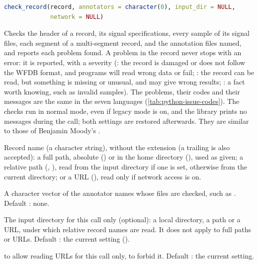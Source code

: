 \begin{lstlisting}[language=R,style=signature]
check_record(record, annotators = character(0), input_dir = NULL,
             network = NULL)
\end{lstlisting}
Checks the header of a record, its signal specifications, every sample of its signal
files, each segment of a multi-segment record, and the annotation files named, and
reports each problem found. A problem in the record never stops with an error: it is
reported, with a severity (: the record is damaged or does not follow the
WFDB format, and programs will read wrong data or fail; : the record can
be read, but something is missing or unusual, and may give wrong results; :
a fact worth knowing, such as invalid samples). The problems, their codes and their
messages are the same in the seven languages (\cref{tab:python-issue-codes}). The checks
run in normal mode, even if legacy mode is on, and the library prints no messages during
the call; both settings are restored afterwards. They are similar to those of Benjamin
Moody's .
\begin{params}
\item[record] Record name (a character string), without the  extension (a
  trailing  is also accepted): a full path, absolute
  () or in the home directory
  (), used as given; a relative path (,
  ), read from the input directory if one is set, otherwise from the
  current directory; or a URL (),
  read only if network access is on.
\item[annotators] A character vector of the annotator names whose files are checked, such
  as . Default : none.
\item[input\_dir] The input directory for this call only (optional): a local directory, a
  \code{\textasciitilde} path or a URL, under which relative record names are read. It does not
  apply to full paths or URLs. Default : the current setting
  ().
\item[network]  to allow reading URLs for this call only,  to
  forbid it. Default : the current setting.
\end{params}
